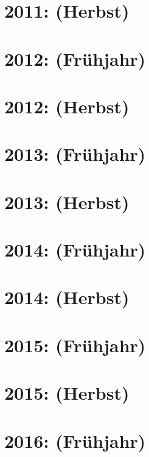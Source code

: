 \documentclass{lehramt-informatik-haupt}
\begin{document}
\section{2011: (Herbst)}


\section{2012: (Frühjahr)}


\section{2012: (Herbst)}


\section{2013: (Frühjahr)}


\section{2013: (Herbst)}


\section{2014: (Frühjahr)}


\section{2014: (Herbst)}


\section{2015: (Frühjahr)}


\section{2015: (Herbst)}


\section{2016: (Frühjahr)}

\end{document}
